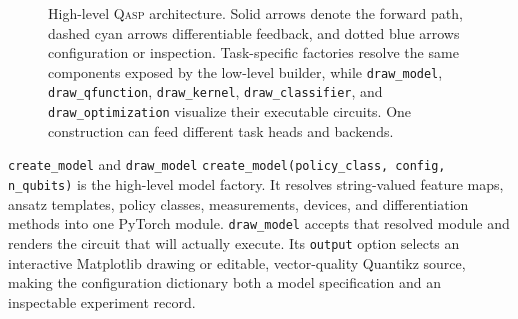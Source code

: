 \documentclass[10pt]{article}
\newcommand{\qasp}{\textsc{Qasp}}
\newcommand{\code}[1]{\texttt{#1}}
\begin{document}
\begin{figure}[t]
{
}
\caption{High-level \qasp{} architecture.  Solid arrows denote the forward
path, dashed cyan arrows differentiable feedback, and dotted blue arrows
configuration or inspection.  Task-specific factories resolve the same
components exposed by the low-level builder, while \code{draw\_model},
\code{draw\_qfunction},
\code{draw\_kernel}, \code{draw\_classifier}, and
\code{draw\_optimization} visualize their executable circuits.  One
construction can feed different task heads and backends.}
\label{fig:architecture}
\end{figure}

\begin{qaspfeature}{\code{create\_model} and \code{draw\_model}}
\code{create\_model(policy\_class, config, n\_qubits)} is the high-level model
factory.  It resolves string-valued feature maps, ansatz templates, policy
classes, measurements, devices, and differentiation methods into one PyTorch
module.  \code{draw\_model} accepts that resolved module and renders the circuit
that will actually execute.  Its \code{output} option selects an interactive
Matplotlib drawing or editable, vector-quality Quantikz source, making the
configuration dictionary both a model specification and an inspectable
experiment record.
\end{qaspfeature}
\end{document}
